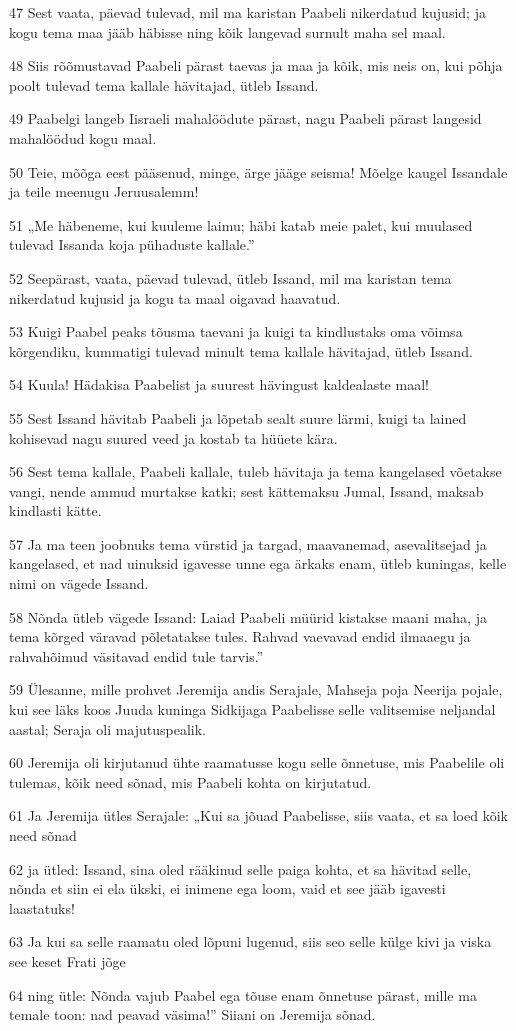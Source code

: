 \par 47 Sest vaata, päevad tulevad, mil ma karistan Paabeli nikerdatud kujusid; ja kogu tema maa jääb häbisse ning kõik langevad surnult maha sel maal.
\par 48 Siis rõõmustavad Paabeli pärast taevas ja maa ja kõik, mis neis on, kui põhja poolt tulevad tema kallale hävitajad, ütleb Issand.
\par 49 Paabelgi langeb Iisraeli mahalöödute pärast, nagu Paabeli pärast langesid mahalöödud kogu maal.
\par 50 Teie, mõõga eest pääsenud, minge, ärge jääge seisma! Mõelge kaugel Issandale ja teile meenugu Jeruusalemm!
\par 51 „Me häbeneme, kui kuuleme laimu; häbi katab meie palet, kui muulased tulevad Issanda koja pühaduste kallale.”
\par 52 Seepärast, vaata, päevad tulevad, ütleb Issand, mil ma karistan tema nikerdatud kujusid ja kogu ta maal oigavad haavatud.
\par 53 Kuigi Paabel peaks tõusma taevani ja kuigi ta kindlustaks oma võimsa kõrgendiku, kummatigi tulevad minult tema kallale hävitajad, ütleb Issand.
\par 54 Kuula! Hädakisa Paabelist ja suurest hävingust kaldealaste maal!
\par 55 Sest Issand hävitab Paabeli ja lõpetab sealt suure lärmi, kuigi ta lained kohisevad nagu suured veed ja kostab ta hüüete kära.
\par 56 Sest tema kallale, Paabeli kallale, tuleb hävitaja ja tema kangelased võetakse vangi, nende ammud murtakse katki; sest kättemaksu Jumal, Issand, maksab kindlasti kätte.
\par 57 Ja ma teen joobnuks tema vürstid ja targad, maavanemad, asevalitsejad ja kangelased, et nad uinuksid igavesse unne ega ärkaks enam, ütleb kuningas, kelle nimi on vägede Issand.
\par 58 Nõnda ütleb vägede Issand: Laiad Paabeli müürid kistakse maani maha, ja tema kõrged väravad põletatakse tules. Rahvad vaevavad endid ilmaaegu ja rahvahõimud väsitavad endid tule tarvis.”
\par 59 Ülesanne, mille prohvet Jeremija andis Serajale, Mahseja poja Neerija pojale, kui see läks koos Juuda kuninga Sidkijaga Paabelisse selle valitsemise neljandal aastal; Seraja oli majutuspealik.
\par 60 Jeremija oli kirjutanud ühte raamatusse kogu selle õnnetuse, mis Paabelile oli tulemas, kõik need sõnad, mis Paabeli kohta on kirjutatud.
\par 61 Ja Jeremija ütles Serajale: „Kui sa jõuad Paabelisse, siis vaata, et sa loed kõik need sõnad
\par 62 ja ütled: Issand, sina oled rääkinud selle paiga kohta, et sa hävitad selle, nõnda et siin ei ela ükski, ei inimene ega loom, vaid et see jääb igavesti laastatuks!
\par 63 Ja kui sa selle raamatu oled lõpuni lugenud, siis seo selle külge kivi ja viska see keset Frati jõge
\par 64 ning ütle: Nõnda vajub Paabel ega tõuse enam õnnetuse pärast, mille ma temale toon: nad peavad väsima!” Siiani on Jeremija sõnad.

